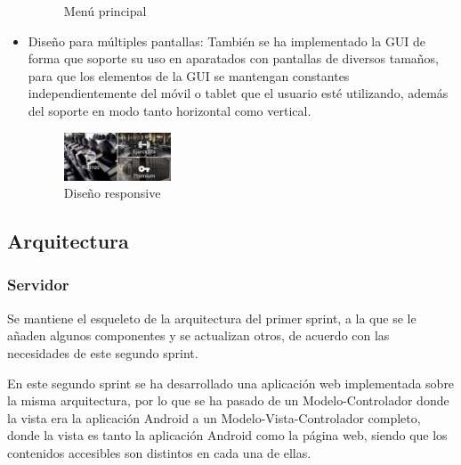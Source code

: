 \documentclass[11pt,a4paper]{report}
\begin{document}
\begin{itemize}
\begin{figure}[H]
		\caption{Menú principal}
	\end{figure}
	\item Diseño para múltiples pantallas: También se ha implementado la GUI de forma que soporte su uso en aparatados con pantallas de diversos tamaños, para que los elementos de la GUI se mantengan constantes independientemente del móvil o tablet que el usuario esté utilizando, además del soporte en modo tanto horizontal como vertical.
	\begin{figure}[H]
		\centering
		\includegraphics[width=0.3\textwidth]{graficos/Usabilidad/portrait.jpg}
		\caption{Diseño responsive}
	\end{figure}
\end{itemize}

\subsection{Arquitectura}
\subsubsection{Servidor}
Se mantiene el esqueleto de la arquitectura del primer sprint, a la que se le añaden algunos componentes y se actualizan otros, de acuerdo con las necesidades de este segundo sprint.

En este segundo sprint se ha desarrollado una aplicación web implementada sobre la misma arquitectura, por lo que se ha pasado de un Modelo-Controlador donde la vista era la aplicación Android a un Modelo-Vista-Controlador completo, donde la vista es tanto la aplicación Android como la página web, siendo que los contenidos accesibles son distintos en cada una de ellas.
\end{document}
